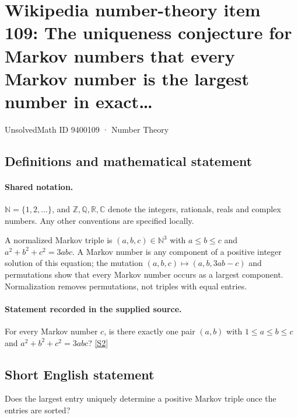 \documentclass[11pt]{article}
\newcommand{\sref}[2]{\hyperlink{source:#1:#2}{[S#2]}}
\begin{document}
\setcounter{section}{9400108}
\section{Wikipedia number-theory item 109: The uniqueness conjecture for Markov numbers that every Markov number is the largest number in exact…}\label{9400109}
{\small\sffamily UnsolvedMath ID 9400109 · Number Theory}
\subsection{Definitions and mathematical statement}

\paragraph{Shared notation.}$\mathbb N=\{1,2,\ldots\}$, and $\mathbb Z,\mathbb Q,\mathbb R,\mathbb C$ denote the integers, rationals, reals and complex numbers. Any other conventions are specified locally.


A normalized Markov triple is $(a,b,c)\in\mathbb N^3$ with $a\le b\le c$ and $a^2+b^2+c^2=3abc$. A Markov number is any component of a positive integer solution of this equation; the mutation $(a,b,c)\mapsto(a,b,3ab-c)$ and permutations show that every Markov number occurs as a largest component. Normalization removes permutations, not triples with equal entries.
\paragraph{Statement recorded in the supplied source.}
For every Markov number $c$, is there exactly one pair $(a,b)$ with $1\le a\le b\le c$ and $a^2+b^2+c^2=3abc$? \sref{9400109}{2}
\subsection{Short English statement}
Does the largest entry uniquely determine a positive Markov triple once the entries are sorted?
\end{document}
